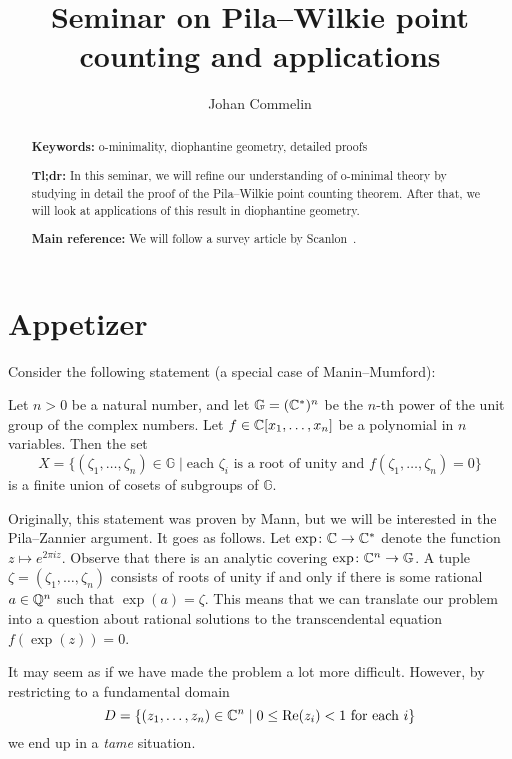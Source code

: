\documentclass[10pt, a4paper]{amsart}
\title{Seminar on Pila--Wilkie point counting and applications}
\author{Johan Commelin}
\begin{document}
\maketitle

\begin{abstract}
  \textbf{Keywords:}
  o-minimality, diophantine geometry, detailed proofs
  
  \medskip\noindent
  \textbf{Tl;dr:}
  In this seminar,
  we will refine our understanding of o-minimal theory
  by studying in detail the proof of the Pila--Wilkie point counting theorem.
  After that, we will look at applications of this result in diophantine geometry.

  \medskip\noindent
  \textbf{Main reference:}
  We will follow a survey article by Scanlon~\cite{scanlon}.
\end{abstract}

\section*{Appetizer}
Consider the following statement (a special case of Manin--Mumford):

\begin{theorem}
  Let $n > 0$ be a natural number,
  and let $\mathbb G = (\mathbb{C}^*)^n$
  be the $n$-th power of the unit group of the complex numbers.
  Let $f \in \mathbb{C}[x_1, \dots, x_n]$ be a polynomial in $n$ variables.
  Then the set
  \[
    X = \{ (\zeta_1, \dots, \zeta_n) \in \mathbb G \mid
    \text{each $\zeta_i$ is a root of unity and $f(\zeta_1, \dots, \zeta_n) = 0$}\}
  \]
  is a finite union of cosets of subgroups of $\mathbb G$.
\end{theorem}

Originally, this statement was proven by Mann,
but we will be interested in the Pila--Zannier argument.
It goes as follows.
Let $\exp \colon \mathbb{C} \to \mathbb{C}^*$ denote the function $z \mapsto e^{2\pi iz}$.
Observe that there is an analytic covering $\exp \colon \mathbb{C}^n \to \mathbb G$.
A tuple $\zeta = (\zeta_1, \dots, \zeta_n)$ consists of roots of unity
if and only if there is some rational $a \in \mathbb{Q}^n$ such that $\exp(a) = \zeta$.
This means that we can translate our problem into
a question about rational solutions to the transcendental equation $f(\exp(z)) = 0$.

It may seem as if we have made the problem a lot more difficult.
However, by restricting to a fundamental domain
\[
  D = \{ (z_1, \dots, z_n) \in \mathbb{C}^n \mid 0 \le \mathrm{Re}(z_i) < 1 \text{ for each $i$}\}
\]
we end up in a \emph{tame} situation.
\end{document}
